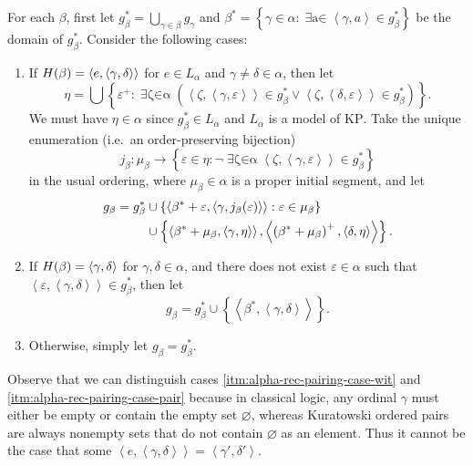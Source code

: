 \documentclass[12pt,openany]{book}
\theoremstyle{plain}
\theoremstyle{definition}
\newcommand\uplabel[1]{\textup{(#1)}}
\newcommand\tuple[1]{\left\langle #1 \right\rangle}
\newcommand\opE[1]{\mathop{\exists #1}}
\newcommand\KP{\mathrm{KP}}
\begin{document}
For each $\beta$, first let $g^*_\beta = \bigcup_{\gamma \in \beta} g_\gamma$ and $\beta^* = \left\{\gamma \in \alpha : \opE{a \in L_\alpha} \tuple{\gamma, a} \in g^*_\beta\right\}$ be the domain of $g^*_\beta$. Consider the following cases:
\begin{enumerate}[label=\uplabel{\roman*}]
  \item \label{itm:alpha-rec-pairing-case-wit} If $H\mleft(\beta\mright) = \tuple{e, \tuple{\gamma, \delta}}$ for $e \in L_\alpha$ and $\gamma \neq \delta \in \alpha$, then let
        \[\eta = \bigcup \left\{\varepsilon^+ : \opE{\zeta \in \alpha} \left(\tuple{\zeta, \tuple{\gamma, \varepsilon}} \in g^*_\beta \lor \tuple{\zeta, \tuple{\delta, \varepsilon}} \in g^*_\beta\right)\right\}.\]
        We must have $\eta \in \alpha$ since $g^*_\beta \in L_\alpha$ and $L_\alpha$ is a model of $\KP$. Take the unique enumeration (i.e.\ an order-preserving bijection)
        \[j_\beta : \mu_\beta \rightarrow \left\{\varepsilon \in \eta : \neg\!\opE{\zeta \in \alpha} \tuple{\zeta, \tuple{\gamma, \varepsilon}} \in g^*_\beta\right\}\]
        in the usual ordering, where $\mu_\beta \in \alpha$ is a proper initial segment, and let
        \begin{align*}
          g_\beta = g^*_\beta & \cup \left\{\tuple{\beta^* + \varepsilon, \tuple{\gamma, j_\beta\mleft(\varepsilon\mright)}} : \varepsilon \in \mu_\beta\right\}         \\
                              & \cup \left\{\tuple{\beta^* + \mu_\beta, \tuple{\gamma, \eta}}, \tuple{\left(\beta^* + \mu_\beta\right)^+, \tuple{\delta, \eta}}\right\}.
        \end{align*}
  \item \label{itm:alpha-rec-pairing-case-pair} If $H\mleft(\beta\mright) = \tuple{\gamma, \delta}$ for $\gamma, \delta \in \alpha$, and there does not exist $\varepsilon \in \alpha$ such that $\tuple{\varepsilon, \tuple{\gamma, \delta}} \in g^*_\beta$, then let
        \[g_\beta = g^*_\beta \cup \left\{\tuple{\beta^*, \tuple{\gamma, \delta}}\right\}.\]
  \item Otherwise, simply let $g_\beta = g^*_\beta$.
\end{enumerate}
Observe that we can distinguish cases \ref{itm:alpha-rec-pairing-case-wit} and \ref{itm:alpha-rec-pairing-case-pair} because in classical logic, any ordinal $\gamma$ must either be empty or contain the empty set $\varnothing$, whereas Kuratowski ordered pairs are always nonempty sets that do not contain $\varnothing$ as an element. Thus it cannot be the case that some $\tuple{e, \tuple{\gamma, \delta}} = \tuple{\gamma', \delta'}$.
\end{document}
